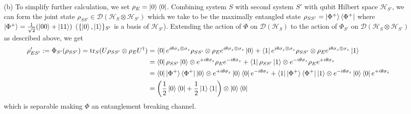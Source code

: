 \documentclass[10pt, a4paper]{article}
\begin{document}
{\begin{enumerate}
  \newpage
  \item[(b)] To simplify further calculation, we set $\rho_E = \ket{0}\bra{0}$. Combining system $S$  with second system $S'$ with qubit Hilbert space $\mathcal{H}_{S'}$, we can form the joint state $\rho_{SS'} \in \mathcal{D}(\mathcal{H}_S \otimes \mathcal{H}_{S'})$ which we take to be the maximally entangled state $\rho_{SS'} = \ket{\Phi^+}\bra{\Phi^+}$ where $\ket{\Phi^+} = \frac{1}{\sqrt{2}}(\ket{00} + \ket{11})$ ($\{\ket{0}, \ket{1}\}_{S'}$ is a basis of $\mathcal{H}_{S'}$). Extending the action of $\Phi$ on $\mathcal{D}(\mathcal{H}_S)$ to the action of $\Phi_{S'}$ on $\mathcal{D}(\mathcal{H}_S \otimes \mathcal{H}_{S'})$ as described above, we get 
  \begin{align*}
    \rho_{ES'}' := \Phi_{S'}(\rho_{SS'}) = \text{tr}_S (U \rho_{SS'} \otimes\rho_E U^\dagger) &= \bra{0} e^{i \theta \sigma_z \otimes \sigma_z} \rho_{SS'} \otimes\rho_E e^{i \theta \sigma_z \otimes \sigma_z} \ket{0} + \bra{1} e^{i \theta \sigma_z \otimes \sigma_z} \rho_{SS'}\otimes\rho_E e^{i \theta \sigma_z \otimes \sigma_z} \ket{1} \\
    &=   \bra{0}\rho_{SS'} \ket{0} \otimes e^{+i \theta \sigma_z} \rho_E e^{-i \theta \sigma_z} +   \bra{1}\rho_{SS'}\ket{1} \otimes e^{-i \theta \sigma_z} \rho_E  e^{+i \theta \sigma_z}\\
    &=  \bra{0}\ket{\Phi^+}\bra{\Phi^+} \ket{0} \otimes e^{+i \theta \sigma_z} \ket{0}\bra{0} e^{-i \theta \sigma_z} +   \bra{1}\ket{\Phi^+}\bra{\Phi^+}\ket{1} \otimes e^{-i \theta \sigma_z} \ket{0}\bra{0}  e^{+i \theta \sigma_z}\\
    &= \left(\frac{1}{2}\ket{0}\bra{0}  + \frac{1}{2}\ket{1}\bra{1}\right) \otimes \ket{0}\bra{0}
  \end{align*}
  which is separable making $\Phi$ an entanglement breaking channel.


\end{enumerate}}
\end{document}
